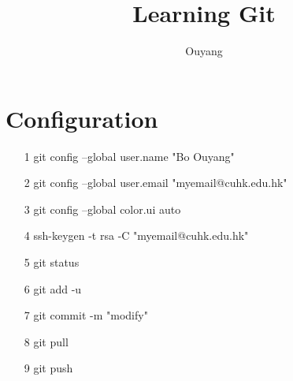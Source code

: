 \documentclass[10pt,a4paper]{article}
\author{Ouyang}
\title{Learning Git}
\begin{document}
	\maketitle
	\section{Configuration}
	\begin{itemize}
		\item[1] git config --global user.name "Bo Ouyang"
		\item[2] git config --global user.email "myemail@cuhk.edu.hk"
		\item[3] git config --global color.ui auto
		\item[4] ssh-keygen -t rsa -C "myemail@cuhk.edu.hk"
		\item[5] git status
		\item[6] git add -u
		\item[7] git commit -m "modify"
		\item[8] git pull
		\item[9] git push
	\end{itemize}
\end{document}
